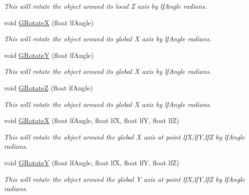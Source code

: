 \begin{DoxyCompactItemize}
\begin{DoxyCompactList}\small\item\em This will rotate the object around its local Z axis by lfAngle radians. \item\end{DoxyCompactList}\item 
void \hyperlink{classc_matrix4_a0be08400d130f819bbedbb35f551d4c7}{GRotateX} (float lfAngle)
\begin{DoxyCompactList}\small\item\em This will rotate the object around its global X axis by lfAngle radians. \item\end{DoxyCompactList}\item 
void \hyperlink{classc_matrix4_a0ae1a3c85f3b00127217b67c7d75a7cc}{GRotateY} (float lfAngle)
\begin{DoxyCompactList}\small\item\em This will rotate the object around its global X axis by lfAngle radians. \item\end{DoxyCompactList}\item 
void \hyperlink{classc_matrix4_a1d082ca0f1c634d262309eb75a9e2df5}{GRotateZ} (float lfAngle)
\begin{DoxyCompactList}\small\item\em This will rotate the object around its global X axis by lfAngle radians. \item\end{DoxyCompactList}\item 
void \hyperlink{classc_matrix4_a517140950c736c74a44d34704b44c83d}{GRotateX} (float lfAngle, float lfX, float lfY, float lfZ)
\begin{DoxyCompactList}\small\item\em This will rotate the object around the global X axis at point lfX,lfY,lfZ by lfAngle radians. \item\end{DoxyCompactList}\item 
void \hyperlink{classc_matrix4_a5b1505c43d9382bc625fc1eb53d44360}{GRotateY} (float lfAngle, float lfX, float lfY, float lfZ)
\begin{DoxyCompactList}\small\item\em This will rotate the object around the global Y axis at point lfX,lfY,lfZ by lfAngle radians. \item\end{DoxyCompactList}\item 

\end{DoxyCompactItemize}
